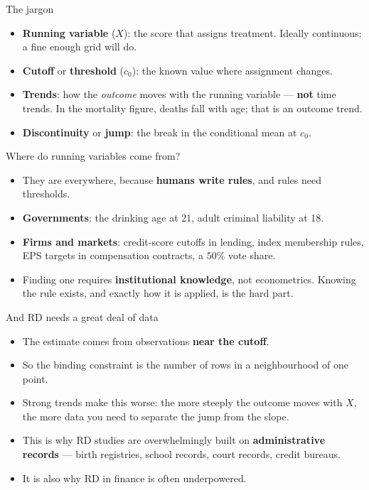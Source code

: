 \documentclass[
  11pt,
  ignorenonframetext,
  aspectratio=169,
]{beamer}
\providecommand{\tightlist}{%
  \setlength{\itemsep}{0pt}\setlength{\parskip}{0pt}}
\begin{document}
\begin{frame}{The jargon}
\protect{}\label{the-jargon}
\begin{itemize}
\tightlist
\item
  \textbf{Running variable} (\(X\)): the score that assigns treatment.
  Ideally continuous; a fine enough grid will do.
\item
  \textbf{Cutoff} or \textbf{threshold} (\(c_0\)): the known value where
  assignment changes.
\item
  \textbf{Trends}: how the \emph{outcome} moves with the running
  variable --- \textbf{not} time trends. In the mortality figure, deaths
  fall with age; that is an outcome trend.
\item
  \textbf{Discontinuity} or \textbf{jump}: the break in the conditional
  mean at \(c_0\).
\end{itemize}
\end{frame}

\begin{frame}{Where do running variables come from?}
\protect{}\label{where-do-running-variables-come-from}
\begin{itemize}
\tightlist
\item
  They are everywhere, because \textbf{humans write rules}, and rules
  need thresholds.
\item
  \textbf{Governments}: the drinking age at 21, adult criminal liability
  at 18.
\item
  \textbf{Firms and markets}: credit-score cutoffs in lending, index
  membership rules, EPS targets in compensation contracts, a \(50\%\)
  vote share.
\item
  Finding one requires \textbf{institutional knowledge}, not
  econometrics. Knowing the rule exists, and exactly how it is applied,
  is the hard part.
\end{itemize}
\end{frame}

\begin{frame}{And RD needs a great deal of data}
\protect{}\label{and-rd-needs-a-great-deal-of-data}
\begin{itemize}
\tightlist
\item
  The estimate comes from observations \textbf{near the cutoff}.
\item
  So the binding constraint is the number of rows in a neighbourhood of
  one point.
\item
  Strong trends make this worse: the more steeply the outcome moves with
  \(X\), the more data you need to separate the jump from the slope.
\item
  This is why RD studies are overwhelmingly built on
  \textbf{administrative records} --- birth registries, school records,
  court records, credit bureaus.
\item
  It is also why RD in finance is often underpowered.
\end{itemize}
\end{frame}
\end{document}
